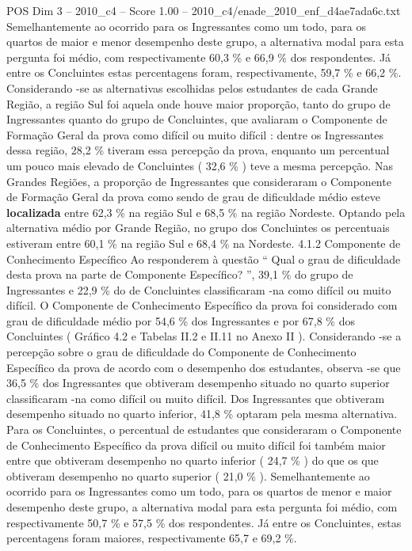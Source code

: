 \begin{textsample}{POS Dim 3 – 2010\_c4 – Score 1.00 – 2010\_c4/enade\_2010\_enf\_d4ae7ada6c.txt}
Semelhantemente ao ocorrido para os Ingressantes como um todo, para os quartos de maior e menor desempenho deste grupo, a alternativa modal para esta pergunta foi médio, com respectivamente 60,3 \% e 66,9 \% dos respondentes.
Já entre os Concluintes estas percentagens foram, respectivamente, 59,7 \% e 66,2 \%.
Considerando -se as alternativas escolhidas pelos estudantes de cada Grande Região, a região Sul foi aquela onde houve maior proporção, tanto do grupo de Ingressantes quanto do grupo de Concluintes, que avaliaram o Componente de Formação Geral da prova como difícil ou muito difícil : dentre os Ingressantes dessa região, 28,2 \% tiveram essa percepção da prova, enquanto um percentual um pouco mais elevado de Concluintes ( 32,6 \% ) teve a mesma percepção.
Nas Grandes Regiões, a proporção de Ingressantes que consideraram o Componente de Formação Geral da prova como sendo de grau de dificuldade médio esteve \textbf{localizada} entre 62,3 \% na região Sul e 68,5 \% na região Nordeste.
Optando pela alternativa médio por Grande Região, no grupo dos Concluintes os percentuais estiveram entre 60,1 \% na região Sul e 68,4 \% na Nordeste. 4.1.2 Componente de Conhecimento Específico Ao responderem à questão “ Qual o grau de dificuldade desta prova na parte de Componente Específico? ”, 39,1 \% do grupo de Ingressantes e 22,9 \% do de Concluintes classificaram -na como difícil ou muito difícil.
O Componente de Conhecimento Específico da prova foi considerado com grau de dificuldade médio por 54,6 \% dos Ingressantes e por 67,8 \% dos Concluintes ( Gráfico 4.2 e Tabelas II.2 e II.11 no Anexo II ).
Considerando -se a percepção sobre o grau de dificuldade do Componente de Conhecimento Específico da prova de acordo com o desempenho dos estudantes, observa -se que 36,5 \% dos Ingressantes que obtiveram desempenho situado no quarto superior classificaram -na como difícil ou muito difícil.
Dos Ingressantes que obtiveram desempenho situado no quarto inferior, 41,8 \% optaram pela mesma alternativa.
Para os Concluintes, o percentual de estudantes que consideraram o Componente de Conhecimento Específico da prova difícil ou muito difícil foi também maior entre que obtiveram desempenho no quarto inferior ( 24,7 \% ) do que os que obtiveram desempenho no quarto superior ( 21,0 \% ).
Semelhantemente ao ocorrido para os Ingressantes como um todo, para os quartos de menor e maior desempenho deste grupo, a alternativa modal para esta pergunta foi médio, com respectivamente 50,7 \% e 57,5 \% dos respondentes.
Já entre os Concluintes, estas percentagens foram maiores, respectivamente 65,7 e 69,2 \%.

\end{textsample}
